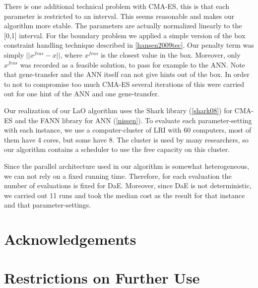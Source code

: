 \documentclass{article}
\begin{document}
There is one additional technical problem with CMA-ES, this is that each parameter is restricted to an interval. This seems reasonable and makes our algorithm more stable. The parameters are actually normalized linearly to the [0,1] interval. For the boundary problem we applied a simple version of the box constraint handling technique described in \ref{hansen2009tec}. Our penalty term was simply \begin{math}||x^{feas}-x|| \end{math}, where \begin{math}x^{feas}\end{math} is the closest value in the box. Moreover, only \begin{math}x^{feas}\end{math} was recorded as a feasible solution, to pass for example to the ANN. Note that gene-transfer and the ANN itself can not give hints out of the box. In order to not to compromise too much CMA-ES several iterations of this were carried out for one hint of the ANN and one gene-transfer.

Our realization of our LaO algorithm uses the Shark library (\ref{shark08}) for CMA-ES and the FANN library for ANN (\ref{nissen}). To evaluate each parameter-setting with each instance, we use a computer-cluster of LRI with 60 computers, most of them have 4 cores, but some have 8. The cluster is used by many researchers, so our algorithm contains a scheduler to use the free capacity on this cluster.

Since the parallel architecture used in our algorithm is somewhat heterogeneous, we can not rely on a fixed running time. Therefore, for each evaluation the number of evaluations is fixed for DaE. Moreover, since DaE is not deterministic, we carried out 11 runs and took the median cost as the result for that instance and that parameter-settings.

\section*{Acknowledgements}

\section*{Restrictions on Further Use}



\end{document}

